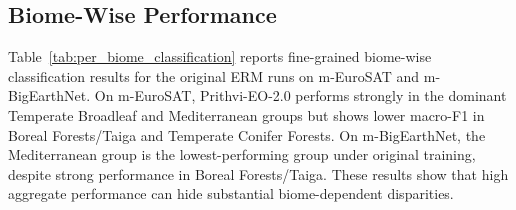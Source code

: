 \documentclass[10pt,twocolumn,letterpaper]{article}
\begin{document}
\subsection{Biome-Wise Performance}

Table~\ref{tab:per_biome_classification} reports fine-grained biome-wise classification results for the original ERM runs on m-EuroSAT and m-BigEarthNet. On m-EuroSAT, Prithvi-EO-2.0 performs strongly in the dominant Temperate Broadleaf and Mediterranean groups but shows lower macro-F1 in Boreal Forests/Taiga and Temperate Conifer Forests. On m-BigEarthNet, the Mediterranean group is the lowest-performing group under original training, despite strong performance in Boreal Forests/Taiga. These results show that high aggregate performance can hide substantial biome-dependent disparities.
\end{document}
